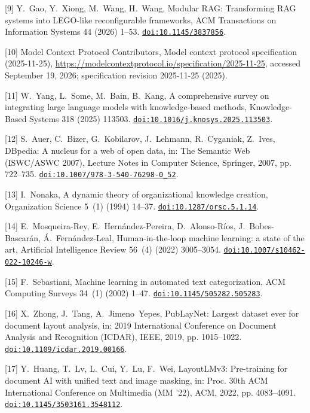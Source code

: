 [9] Y.~Gao, Y.~Xiong, M.~Wang, H.~Wang, Modular {RAG}: Transforming {RAG} systems into {LEGO}-like reconfigurable frameworks, ACM Transactions on Information Systems 44 (2026) 1--53. \href {https://doi.org/10.1145/3837856} {\texttt{doi:10.1145/3837856}}.

[10] {Model Context Protocol Contributors}, Model context protocol specification (2025-11-25), \url{https://modelcontextprotocol.io/specification/2025-11-25}, accessed September 19, 2026; specification revision 2025-11-25 (2025).

[11] W.~Yang, L.~Some, M.~Bain, B.~Kang, A comprehensive survey on integrating large language models with knowledge-based methods, Knowledge-Based Systems 318 (2025) 113503. \href {https://doi.org/10.1016/j.knosys.2025.113503} {\texttt{doi:10.1016/j.knosys.2025.113503}}.

[12] S.~Auer, C.~Bizer, G.~Kobilarov, J.~Lehmann, R.~Cyganiak, Z.~Ives, {DBpedia}: A nucleus for a web of open data, in: The Semantic Web (ISWC/ASWC 2007), Lecture Notes in Computer Science, Springer, 2007, pp. 722--735. \href {https://doi.org/10.1007/978-3-540-76298-0_52} {\texttt{doi:10.1007/978-3-540-76298-0\_52}}.

[13] I.~Nonaka, A dynamic theory of organizational knowledge creation, Organization Science 5~(1) (1994) 14--37. \href {https://doi.org/10.1287/orsc.5.1.14} {\texttt{doi:10.1287/orsc.5.1.14}}.

[14] E.~Mosqueira-Rey, E.~Hern{\'a}ndez-Pereira, D.~Alonso-R{\'i}os, J.~Bobes-Bascar{\'a}n, {\'A}.~Fern{\'a}ndez-Leal, Human-in-the-loop machine learning: a state of the art, Artificial Intelligence Review 56~(4) (2022) 3005--3054. \href {https://doi.org/10.1007/s10462-022-10246-w} {\texttt{doi:10.1007/s10462-022-10246-w}}.

[15] F.~Sebastiani, Machine learning in automated text categorization, ACM Computing Surveys 34~(1) (2002) 1--47. \href {https://doi.org/10.1145/505282.505283} {\texttt{doi:10.1145/505282.505283}}.

[16] X.~Zhong, J.~Tang, A.~Jimeno~Yepes, {PubLayNet}: Largest dataset ever for document layout analysis, in: 2019 International Conference on Document Analysis and Recognition (ICDAR), IEEE, 2019, pp. 1015--1022. \href {https://doi.org/10.1109/icdar.2019.00166} {\texttt{doi:10.1109/icdar.2019.00166}}.

[17] Y.~Huang, T.~Lv, L.~Cui, Y.~Lu, F.~Wei, {LayoutLMv3}: Pre-training for document {AI} with unified text and image masking, in: Proc. 30th ACM International Conference on Multimedia (MM '22), ACM, 2022, pp. 4083--4091. \href {https://doi.org/10.1145/3503161.3548112} {\texttt{doi:10.1145/3503161.3548112}}.

